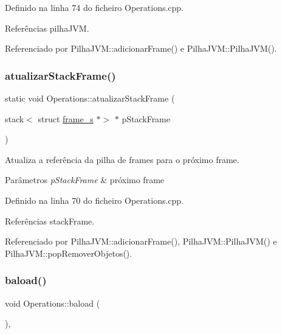Definido na linha 74 do ficheiro Operations.\+cpp.



Referências pilha\+J\+VM.



Referenciado por Pilha\+J\+V\+M\+::adicionar\+Frame() e Pilha\+J\+V\+M\+::\+Pilha\+J\+V\+M().

\mbox{\label{classOperations_a2564df73b5b237e5bda042909c4747b1}} 
\subsubsection{\texorpdfstring{atualizar\+Stack\+Frame()}{atualizarStackFrame()}}
{\footnotesize\ttfamily static void Operations\+::atualizar\+Stack\+Frame (\begin{DoxyParamCaption}\item[{stack$<$ struct \hyperlink{structframe__s}{frame\+\_\+s} $\ast$$>$ $\ast$}]{p\+Stack\+Frame }\end{DoxyParamCaption})\hspace{0.3cm}{\ttfamily [static]}}



Atualiza a referência da pilha de frames para o próximo frame. 


\begin{DoxyParams}{Parâmetros}
{\em p\+Stack\+Frame} & próximo frame \\
\hline
\end{DoxyParams}


Definido na linha 70 do ficheiro Operations.\+cpp.



Referências stack\+Frame.



Referenciado por Pilha\+J\+V\+M\+::adicionar\+Frame(), Pilha\+J\+V\+M\+::\+Pilha\+J\+V\+M() e Pilha\+J\+V\+M\+::pop\+Remover\+Objetos().

\mbox{\label{classOperations_afdf1759637e332569a2b2b17067e05f0}} 
\subsubsection{\texorpdfstring{baload()}{baload()}}
{\footnotesize\ttfamily void Operations\+::baload (\begin{DoxyParamCaption}{ }\end{DoxyParamCaption})\hspace{0.3cm}{\ttfamily [static]}, {\ttfamily [private]}}



